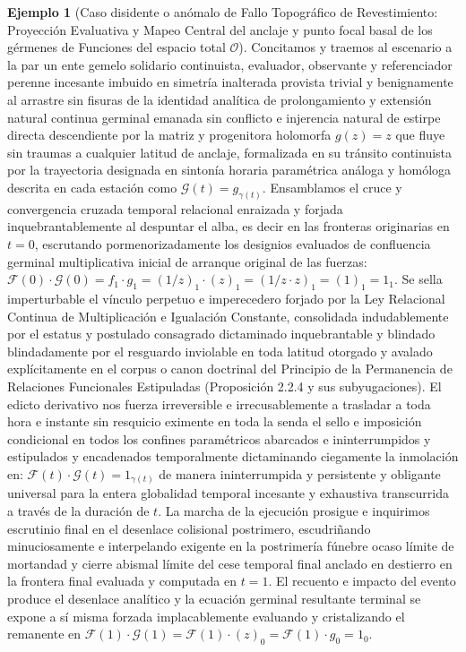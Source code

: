 \documentclass[11pt,a4paper]{article}
\theoremstyle{definition}
\newtheorem{ejemplo}{Ejemplo}[section]
\theoremstyle{remark}
\numberwithin{equation}{section}
\begin{document}
\begin{ejemplo}[Caso disidente o anómalo de Fallo Topográfico de Revestimiento: Proyección Evaluativa y Mapeo Central del anclaje y punto focal basal de los gérmenes de Funciones del espacio total $\mathcal{O}$]
Concitamos y traemos al escenario a la par un ente gemelo solidario continuista, evaluador, observante y referenciador perenne incesante imbuido en simetría inalterada provista trivial y benignamente al arrastre sin fisuras de la identidad analítica de prolongamiento y extensión natural continua germinal emanada sin conflicto e injerencia natural de estirpe directa descendiente por la matriz y progenitora holomorfa $g(z) = z$ que fluye sin traumas a cualquier latitud de anclaje, formalizada en su tránsito continuista por la trayectoria designada en sintonía horaria paramétrica análoga y homóloga descrita en cada estación como $\mathcal{G}(t) = g_{\gamma(t)}$.
Ensamblamos el cruce y convergencia cruzada temporal relacional enraizada y forjada inquebrantablemente al despuntar el alba, es decir en las fronteras originarias en $t=0$, escrutando pormenorizadamente los designios evaluados de confluencia germinal multiplicativa inicial de arranque original de las fuerzas: $\mathcal{F}(0) \cdot \mathcal{G}(0) = f_1 \cdot g_1 = (1/z)_1 \cdot (z)_1 = (1/z \cdot z)_1 = (1)_1 = 1_1$. Se sella imperturbable el vínculo perpetuo e imperecedero forjado por la Ley Relacional Continua de Multiplicación e Igualación Constante, consolidada indudablemente por el estatus y postulado consagrado dictaminado inquebrantable y blindado blindadamente por el resguardo inviolable en toda latitud otorgado y avalado explícitamente en el corpus o canon doctrinal del Principio de la Permanencia de Relaciones Funcionales Estipuladas (Proposición 2.2.4 y sus subyugaciones). El edicto derivativo nos fuerza irreversible e irrecusablemente a trasladar a toda hora e instante sin resquicio eximente en toda la senda el sello e imposición condicional en todos los confines paramétricos abarcados e ininterrumpidos y estipulados y encadenados temporalmente dictaminando ciegamente la inmolación en: $\mathcal{F}(t) \cdot \mathcal{G}(t) = 1_{\gamma(t)}$ de manera ininterrumpida y persistente y obligante universal para la entera globalidad temporal incesante y exhaustiva transcurrida a través de la duración de $t$.
La marcha de la ejecución prosigue e inquirimos escrutinio final en el desenlace colisional postrimero, escudriñando minuciosamente e interpelando exigente en la postrimería fúnebre ocaso límite de mortandad y cierre abismal límite del cese temporal final anclado en destierro en la frontera final evaluada y computada en $t=1$. El recuento e impacto del evento produce el desenlace analítico y la ecuación germinal resultante terminal se expone a sí misma forzada implacablemente evaluando y cristalizando el remanente en $\mathcal{F}(1) \cdot \mathcal{G}(1) = \mathcal{F}(1) \cdot (z)_0 = \mathcal{F}(1) \cdot g_0 = 1_0$.

\end{ejemplo}
\end{document}
